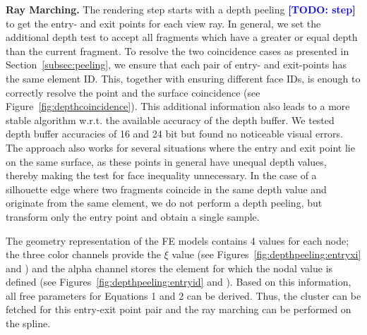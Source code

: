 \documentclass[journal]{vgtc}                %
\newcommand{\todo}[1]{\textbf{\textcolor{blue}{[TODO: {#1}]}}}
\begin{document}
\noindent \textbf{Ray Marching.} The rendering step starts with a depth peeling \todo{step} to get the entry- and exit points for each view ray. In general, we set the additional depth test to accept all fragments which have a greater or equal depth than the current fragment. To resolve the two coincidence cases as presented in Section~\ref{subsec:peeling}, we ensure that each pair of entry- and exit-points has the same element ID. This, together with ensuring different face IDs, is enough to correctly resolve the point and the surface coincidence (see Figure~\ref{fig:depthcoincidence}). This additional information also leads to a more stable algorithm w.r.t. the available accuracy of the depth buffer. We tested depth buffer accuracies of 16 and 24 bit but found no noticeable visual errors. The approach also works for several situations where the entry and exit point lie on the same surface, as these points in general have unequal depth values, thereby making the test for face inequality unnecessary. In the case of a silhouette edge where two fragments coincide in the same depth value and originate from the same element, we do not perform a depth peeling, but transform only the entry point and obtain a single sample.

The geometry representation of the FE models contains 4 values for each node; the three color channels provide the $\xi$ value (see Figures~\ref{fig:depthpeeling:entryxi} and ) and the alpha channel stores the element for which the nodal value is defined (see Figures~\ref{fig:depthpeeling:entryid} and ). Based on this information, all free parameters for Equations 1 and 2 can be derived. Thus, the cluster can be fetched for this entry-exit point pair and the ray marching can be performed on the spline.
\end{document}
